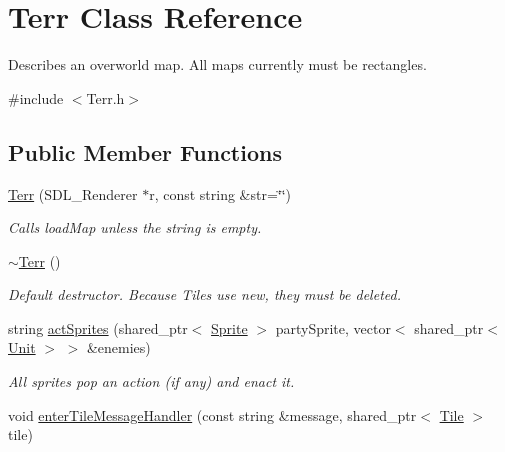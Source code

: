 \hypertarget{class_terr}{}\section{Terr Class Reference}
\label{class_terr}


Describes an overworld map. All maps currently must be rectangles.  




{\ttfamily \#include $<$Terr.\+h$>$}

\subsection*{Public Member Functions}
\begin{DoxyCompactItemize}
\item 
\hyperlink{class_terr_ab2a5e584780b6213d1bf5a7dc3a74c59}{Terr} (S\+D\+L\+\_\+\+Renderer $\ast$r, const string \&str=\char`\"{}\char`\"{})\hypertarget{class_terr_ab2a5e584780b6213d1bf5a7dc3a74c59}{}\label{class_terr_ab2a5e584780b6213d1bf5a7dc3a74c59}

\begin{DoxyCompactList}\small\item\em Calls load\+Map unless the string is empty. \end{DoxyCompactList}\item 
\hyperlink{class_terr_a8b68000bbfdc821e364bdb89f4465c17}{$\sim$\+Terr} ()\hypertarget{class_terr_a8b68000bbfdc821e364bdb89f4465c17}{}\label{class_terr_a8b68000bbfdc821e364bdb89f4465c17}

\begin{DoxyCompactList}\small\item\em Default destructor. Because Tiles use new, they must be deleted. \end{DoxyCompactList}\item 
string \hyperlink{class_terr_adc8910783511bda341ee07d2603823d4}{act\+Sprites} (shared\+\_\+ptr$<$ \hyperlink{class_sprite}{Sprite} $>$ party\+Sprite, vector$<$ shared\+\_\+ptr$<$ \hyperlink{class_unit}{Unit} $>$ $>$ \&enemies)\hypertarget{class_terr_adc8910783511bda341ee07d2603823d4}{}\label{class_terr_adc8910783511bda341ee07d2603823d4}

\begin{DoxyCompactList}\small\item\em All sprites pop an action (if any) and enact it. \end{DoxyCompactList}\item 
void \hyperlink{class_terr_a6b79ff79c2ffbe2606f5906b3f23df12}{enter\+Tile\+Message\+Handler} (const string \&message, shared\+\_\+ptr$<$ \hyperlink{class_tile}{Tile} $>$ tile)\hypertarget{class_terr_a6b79ff79c2ffbe2606f5906b3f23df12}{}\label{class_terr_a6b79ff79c2ffbe2606f5906b3f23df12}


\end{DoxyCompactItemize}

